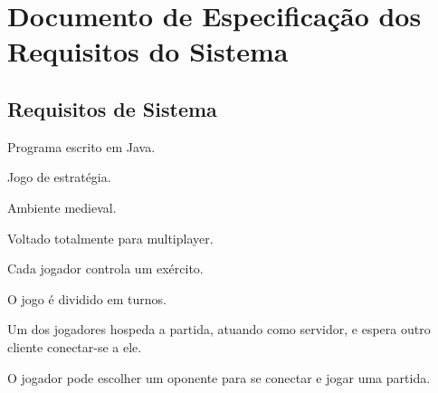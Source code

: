 \section{Documento de Especificação dos Requisitos do Sistema}

\subsection{Requisitos de Sistema}

\begin{itemise}
    \item Programa escrito em Java.
    \item Jogo de estratégia.
    \item Ambiente medieval.
    \item Voltado totalmente para multiplayer.
    \item Cada jogador controla um exército.
    \item O jogo é dividido em turnos.
    \item Um dos jogadores hospeda a partida, atuando como servidor, e espera outro cliente conectar-se a ele.
    \item O jogador pode escolher um oponente para se conectar e jogar uma partida.
\end{itemise}
